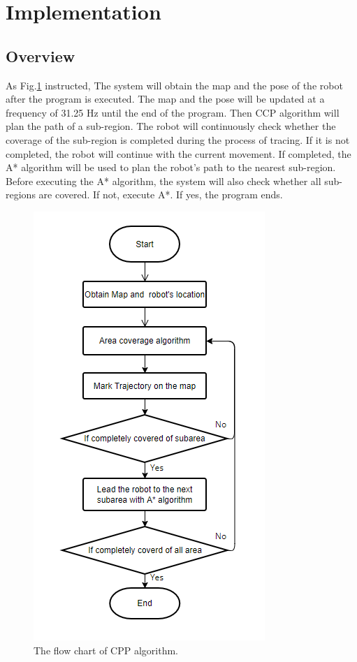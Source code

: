\documentclass[conference]{IEEEtran}
\begin{document}
\section{Implementation}

\subsection{Overview}

As Fig.\ref{fig3} instructed, The system will obtain the map and the pose of the robot after the program is executed. The map and the pose will be updated at a frequency of 31.25 Hz until the end of the program. Then CCP algorithm will plan the path of a sub-region. The robot will continuously check whether the coverage of the sub-region is completed during the process of tracing. If it is not completed, the robot will continue with the current movement. If completed, the A* algorithm will be used to plan the robot's path to the nearest sub-region. Before executing the A* algorithm, the system will also check whether all sub-regions are covered. If not, execute A*. If yes, the 
program ends.

\begin{figure}[htbp]
\setlength{\belowcaptionskip}{-1cm}
\centerline{\includegraphics[scale=0.6]{RS_Report/The Overall architecture of the CPP algorithm.png}}
\caption{The flow chart of CPP algorithm.}
\label{fig3}
\end{figure}
\end{document}
